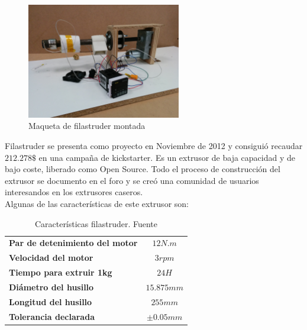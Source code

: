 	\begin{figure}[H]
            \centering
            \includegraphics[width=0.6\textwidth]{images/filaextruder/IMG_20150313_111634.jpg}
            \caption{Maqueta de filastruder montada}
            \label{fig:hardware_filastruder}
    \end{figure}


Filastruder se presenta como proyecto en Noviembre de 2012 \cite{filastruder} y consiguió recaudar $212.278 \$$ en una campaña de kickstarter. Es un extrusor de baja capacidad y de bajo coste, liberado como Open Source. Todo el proceso de construcción del extrusor se documento en el foro y se creó una comunidad de usuarios interesandos en los extrusores caseros.\\

Algunas de las características de este extrusor son:

\begin{table}[H]
\centering

\begin{tabular}{lc}
\textbf{Par de detenimiento del motor}            & $12N.m$                           \\
\textbf{Velocidad del motor}                      & $3 rpm$                           \\
\textbf{Tiempo para extruir 1kg}                  & $24H$                             \\
\textbf{Diámetro del husillo}                     & $15.875mm$                        \\
\textbf{Longitud del husillo}					  & $255mm$           				  \\
\textbf{Tolerancia declarada}					  & $\pm 0.05 mm$					  \\	

\end{tabular}
\caption{Características filastruder. Fuente\cite{tfg_diego}}
\label{tab:caract_filas}
\end{table}

